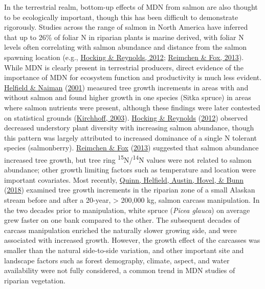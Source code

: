 \documentclass [11pt, proquest] {uwthesis}[2015/03/03]
\begin{document}
In the terrestrial realm, bottom-up effects of MDN from salmon are also thought to be ecologically important, though this has been difficult to demonstrate rigorously. Studies across the range of salmon in North America have inferred that up to 26\% of foliar N in riparian plants is marine derived, with foliar N levels often correlating with salmon abundance and distance from the salmon spawning location (e.g., \protect\hyperlink{ref-Hocking2012}{Hocking \& Reynolds, 2012}; \protect\hyperlink{ref-Reimchen2013}{Reimchen \& Fox, 2013}). While MDN is clearly present in terrestrial producers, direct evidence of the importance of MDN for ecosystem function and productivity is much less evident. \protect\hyperlink{ref-Helfield2001}{Helfield \& Naiman} (\protect\hyperlink{ref-Helfield2001}{2001}) measured tree growth increments in areas with and without salmon and found higher growth in one species (Sitka spruce) in areas where salmon nutrients were present, although these findings were later contested on statistical grounds (\protect\hyperlink{ref-Kirchoff2003}{Kirchhoff, 2003}). \protect\hyperlink{ref-Hocking2012}{Hocking \& Reynolds} (\protect\hyperlink{ref-Hocking2012}{2012}) observed decreased understory plant diversity with increasing salmon abundance, though this pattern was largely attributed to increased dominance of a single N tolerant species (salmonberry). \protect\hyperlink{ref-Reimchen2013}{Reimchen \& Fox} (\protect\hyperlink{ref-Reimchen2013}{2013}) suggested that salmon abundance increased tree growth, but tree ring \textsuperscript{15}N/\textsuperscript{14}N values were not related to salmon abundance; other growth limiting factors such as temperature and location were important covariates. Most recently, \protect\hyperlink{ref-Quinn2018}{Quinn, Helfield, Austin, Hovel, \& Bunn} (\protect\hyperlink{ref-Quinn2018}{2018}) examined tree growth increments in the riparian zone of a small Alaskan stream before and after a 20-year, \textgreater{} 200,000 kg, salmon carcass manipulation. In the two decades prior to manipulation, white spruce (\emph{Picea glauca}) on average grew faster on one bank compared to the other. The subsequent decades of carcass manipulation enriched the naturally slower growing side, and were associated with increased growth. However, the growth effect of the carcasses was smaller than the natural side-to-side variation, and other important site and landscape factors such as forest demography, climate, aspect, and water availability were not fully considered, a common trend in MDN studies of riparian vegetation.
\end{document}

